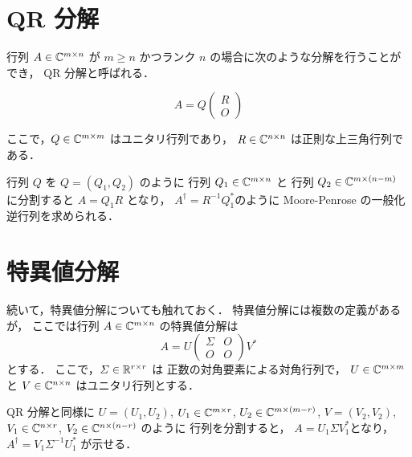 %

\section{QR 分解}

行列 $A \in \mathbb{C}^{m \times n}$ が
$m \ge n$ かつランク $n$ の場合に次のような分解を行うことができ，
QR 分解と呼ばれる．

\begin{equation}
    A = Q
    \begin{pmatrix}
        R \\ O
    \end{pmatrix}
\end{equation}

ここで，$Q \in \mathbb{C}^{m \times m}$ はユニタリ行列であり，
$R \in \mathbb{C}^{n \times n}$ は正則な上三角行列である．

行列 $Q$ を $Q = (Q_1, Q_2)$ のように
行列 $Q_1 \in \mathbb{C}^{m \times n}$ と
行列 $Q_2 \in \mathbb{C}^{m \times (n-m)}$ に分割すると
$A = Q_1 R$ となり，
$A^\dagger = R^{-1} Q_1^*$のように
Moore-Penrose の一般化逆行列を求められる．

\section{特異値分解}

続いて，特異値分解についても触れておく．
特異値分解には複数の定義があるが，
ここでは行列 $A \in \mathbb{C}^{m \times n}$ の特異値分解は
\begin{equation}
    A = U
    \begin{pmatrix}
        \Sigma & O \\
        O      & O
    \end{pmatrix}
    V^*
\end{equation}
とする．
ここで，$\varSigma \in \mathbb{R}^{r \times r}$ は
正数の対角要素による対角行列で，
$U \in \mathbb{C}^{m \times m}$ と
$V \in \mathbb{C}^{n \times n}$ はユニタリ行列とする．

QR 分解と同様に
$U = (U_1, U_2)$,
$U_1 \in \mathbb{C}^{m \times r}$,
$U_2 \in \mathbb{C}^{m \times (m-r)}$,
$V = (V_2, V_2)$,
$V_1 \in \mathbb{C}^{n \times r}$,
$V_2 \in \mathbb{C}^{n \times (n-r)}$ のように
行列を分割すると，
$A = U_1 \Sigma V_1^*$となり，
$A^\dagger = V_1 \Sigma^{-1} U_1^*$ が示せる．
